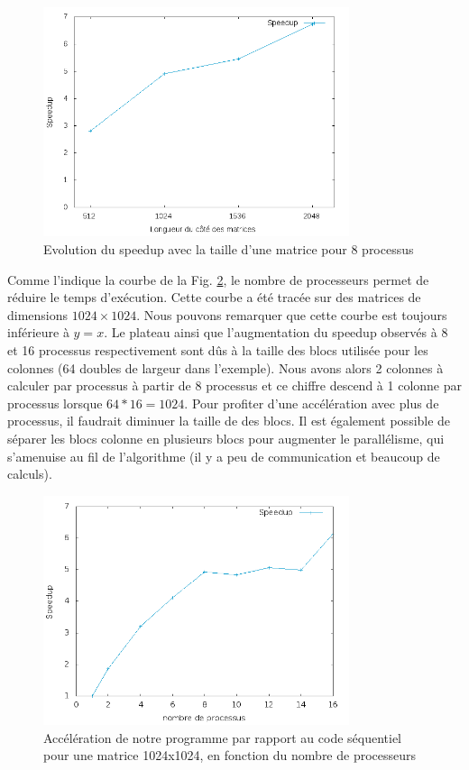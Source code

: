 \begin{figure}[H]
\centering
\includegraphics[width=0.8\textwidth]{sp-size.png}
\caption{Evolution du speedup avec la taille d'une matrice pour 8 processus}
\label{fig:sp-size}
\end{figure}

Comme l'indique la courbe de la Fig. \ref{fig:sp-proc}, le nombre de processeurs permet de réduire le temps d'exécution. Cette courbe a été tracée sur des matrices de dimensions $1024\times1024$. Nous pouvons remarquer que cette courbe est toujours inférieure à $y = x$. Le plateau ainsi que l'augmentation du speedup observés à 8 et 16 processus respectivement sont dûs à la taille des blocs utilisée pour les colonnes (64 doubles de largeur dans l'exemple). Nous avons alors 2 colonnes à calculer par processus à partir de 8 processus et ce chiffre descend à 1 colonne par processus lorsque $64*16 = 1024$. Pour profiter d'une accélération avec plus de processus, il faudrait diminuer la taille de des blocs. Il est également possible de séparer les blocs colonne en plusieurs blocs pour augmenter le parallélisme, qui s'amenuise au fil de l'algorithme (il y a peu de communication et beaucoup de calculs).

\begin{figure}[H]
\centering
\includegraphics[width=0.8\textwidth]{sp-proc.png}
\caption{Accélération de notre programme par rapport au code séquentiel pour une matrice 1024x1024, en fonction du nombre de processeurs}
\label{fig:sp-proc}
\end{figure}


